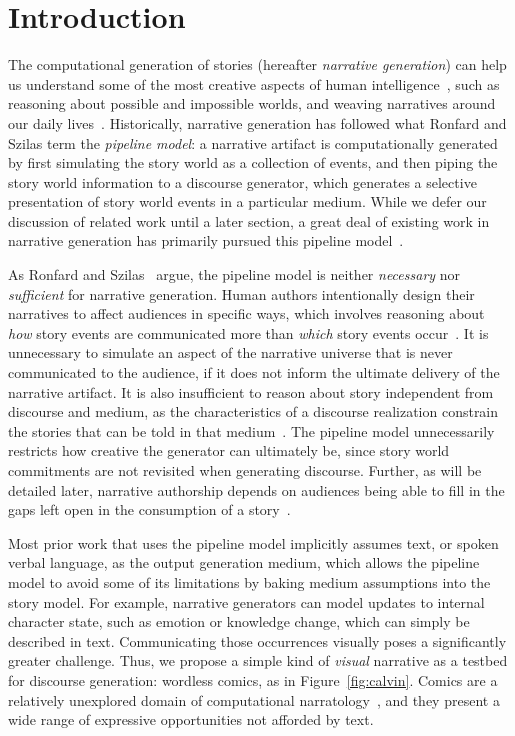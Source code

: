 \section{Introduction}

The computational generation of stories (hereafter {\em narrative
generation}) can help us understand some of the most creative aspects of
human intelligence~\cite{boyd2009origin}, such as reasoning about possible
and impossible worlds, and weaving narratives around our daily
lives~\cite{herman2013storytelling}.  Historically, narrative generation
has followed what Ronfard and Szilas \cite{ronfard2014story} term the
\emph{pipeline model}: a narrative artifact is computationally generated by
first simulating the story world as a collection of events, and then piping
the story world information to a discourse generator, which generates a
selective presentation of story world events in a particular medium. While
we defer our discussion of related  work until a later section, a great
deal of existing work in narrative generation has primarily pursued this
pipeline model~\cite{gervas2009computational}. 

As Ronfard and Szilas~\cite{ronfard2014story} argue, the pipeline model is neither
\emph{necessary} nor \emph{sufficient} for narrative generation. 
Human authors intentionally design their narratives to affect audiences in
specific ways, which involves reasoning about {\em how} story events are
communicated more than {\em which} story events
occur~\cite{chatman1980story,bordwell1989making}. It is unnecessary to
simulate an aspect of the narrative universe that is never communicated to
the audience, if it does not inform the ultimate delivery of the narrative
artifact. It is also insufficient to reason about story independent from
discourse and medium, as the characteristics of a discourse realization
constrain the stories that can be told in that
medium~\cite{herman2004toward}.  The pipeline model unnecessarily restricts
how creative the generator can ultimately be, since story world commitments
are not revisited when generating discourse. Further, as will be detailed
later, narrative authorship depends on audiences being able to fill in the
gaps left open in the consumption of a
story~\cite{saraceni2016relatedness,magliano2016filling}.

Most prior work that uses the pipeline model implicitly assumes text, or
spoken verbal language, as the output generation medium, which allows the
pipeline model to avoid some of its limitations by baking medium
assumptions into the story model. For example, narrative generators can
model updates to internal character state, such as emotion or knowledge
change, which can simply be described in text. Communicating those
occurrences visually poses a significantly greater challenge.
Thus, we propose a simple kind of {\em visual} narrative as a testbed for
discourse generation: wordless comics, as in Figure~\ref{fig:calvin}. 
Comics are a relatively unexplored
domain of computational narratology~\cite{mani2012computational}, and they
present a wide range of expressive opportunities not afforded by text.

